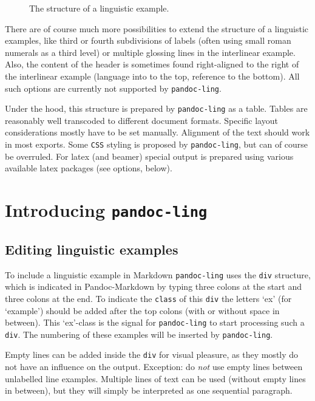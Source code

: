 \documentclass[
]{article}
\makeatletter
\newcommand*\pandocbounded[1]{%
  \sbox\pandoc@box{#1}%
  \Gscale@div\@tempa{\textheight}{\dimexpr\ht\pandoc@box+\dp\pandoc@box\relax}%
  \Gscale@div\@tempb{\linewidth}{\wd\pandoc@box}%
  \ifdim\@tempb\p@<\@tempa\p@\let\@tempa\@tempb\fi%
  \ifdim\@tempa\p@<\p@\scalebox{\@tempa}{\usebox\pandoc@box}%
  \else\usebox{\pandoc@box}%
  \fi%
}
\makeatother
\begin{document}
\begin{figure}
\centering
\pandocbounded{\texttt{[image: figure/ExampleStructure.png]}}
\caption{The structure of a linguistic example.}
\end{figure}

There are of course much more possibilities to extend the structure of a
linguistic examples, like third or fourth subdivisions of labels (often
using small roman numerals as a third level) or multiple glossing lines
in the interlinear example. Also, the content of the header is sometimes
found right-aligned to the right of the interlinear example (language
into to the top, reference to the bottom). All such options are
currently not supported by \texttt{pandoc-ling}.

Under the hood, this structure is prepared by \texttt{pandoc-ling} as a
table. Tables are reasonably well transcoded to different document
formats. Specific layout considerations mostly have to be set manually.
Alignment of the text should work in most exports. Some \texttt{CSS}
styling is proposed by \texttt{pandoc-ling}, but can of course be
overruled. For latex (and beamer) special output is prepared using
various available latex packages (see options, below).

\section{\texorpdfstring{Introducing
\texttt{pandoc-ling}}{Introducing pandoc-ling}}\label{introducing-pandoc-ling}

\subsection{Editing linguistic
examples}\label{editing-linguistic-examples}

To include a linguistic example in Markdown \texttt{pandoc-ling} uses
the \texttt{div} structure, which is indicated in Pandoc-Markdown by
typing three colons at the start and three colons at the end. To
indicate the \texttt{class} of this \texttt{div} the letters `ex' (for
`example') should be added after the top colons (with or without space
in between). This `ex'-class is the signal for \texttt{pandoc-ling} to
start processing such a \texttt{div}. The numbering of these examples
will be inserted by \texttt{pandoc-ling}.

Empty lines can be added inside the \texttt{div} for visual pleasure, as
they mostly do not have an influence on the output. Exception: do
\emph{not} use empty lines between unlabelled line examples. Multiple
lines of text can be used (without empty lines in between), but they
will simply be interpreted as one sequential paragraph.
\end{document}
